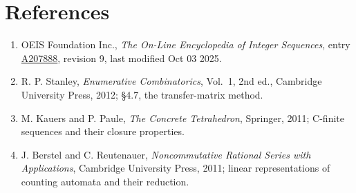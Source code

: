 \documentclass[11pt]{article}
\theoremstyle{definition}
\begin{document}
\section{References}

\begin{enumerate}

\item OEIS Foundation Inc., \emph{The On-Line Encyclopedia of Integer Sequences}, entry \href{https://oeis.org/A207888}{A207888}, revision 9, last modified Oct 03 2025.

\item R. P. Stanley, \emph{Enumerative Combinatorics}, Vol.~1, 2nd ed., Cambridge University Press, 2012; \S4.7, the transfer-matrix method.

\item M. Kauers and P. Paule, \emph{The Concrete Tetrahedron}, Springer, 2011; C-finite sequences and their closure properties.

\item J. Berstel and C. Reutenauer, \emph{Noncommutative Rational Series with Applications}, Cambridge University Press, 2011; linear representations of counting automata and their reduction.

\end{enumerate}
\end{document}
